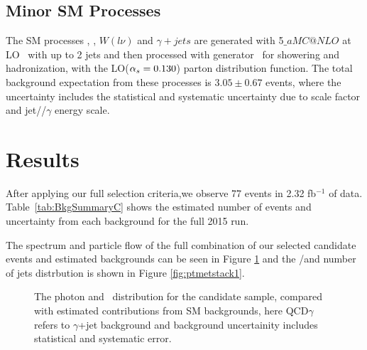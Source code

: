  \subsection{Minor SM Processes}
The SM processes \wlng, \zllg, $W(l\nu)$ and $\gamma+jets$
 are generated with \MADGRAPH{}5$\_aMC@NLO$ at LO~\cite{Madgraph_new}
 with up to 2 jets and then
 processed with  generator~\cite{Pythia6} for showering and hadronization,
 with the \NNPDFthree LO($\alpha_s = 0.130$) parton distribution function.
The total background expectation from these processes is $3.05\pm 0.67$ events,
 where the uncertainty includes the statistical and systematic uncertainty due
 to scale factor and jet/\met/$\gamma$ energy scale.


 
\section{Results}

After applying our full selection criteria,we observe 77 events in 2.32 fb$^{-1}$ of data.
Table~\ref{tab:BkgSummaryC}
shows the estimated number of events and uncertainty from each background for the full 2015 run.


The \pt spectrum and particle flow \met of the full combination of our selected candidate events and estimated backgrounds can be seen in Figure \ref{fig:ptmetstack}
and the \pt/\met and number of jets distrbution is shown in Figure \ref{fig:ptmetstack1}.

\begin{figure}[!h]
\caption[Distributions of \pt and \met in the \pploneg analysis]{The photon \pt and \met\ distribution for the candidate sample, compared with estimated contributions from SM backgrounds, here QCD$\gamma$ refers to $\gamma$+jet background and background uncertainity includes statistical and systematic error. }
\centering
\label{fig:ptmetstack}
\end{figure}


